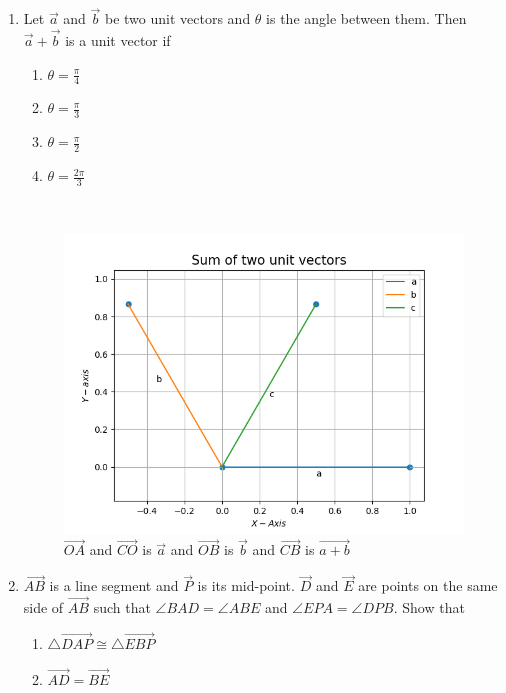 \begin{enumerate}[label=\thesection.\arabic*,ref=\thesection.\theenumi]
\item Let $\vec{a}$ and $\vec{b}$ be two unit vectors and $\theta$ is the angle between them. Then $\vec{a}+\vec{b}$ is a unit vector if
	\begin{enumerate}
		\item $\theta = \frac{\pi}{4}$
		\item $\theta = \frac{\pi}{3}$
		\item $\theta = \frac{\pi}{2}$
		\item $\theta = \frac{2\pi}{3}$
			\end{enumerate}
\solution

\\
\begin{figure}[!ht]
	\centering
	\includegraphics[width=\columnwidth]{chapters/12/10/5/17/codes/Python/figs/fig.png}
	\caption{$\vec{OA}$ and $\vec{CO}$ is $\vec{a}$ and $\vec{OB}$ is $\vec{b}$ and $\vec{CB}$ is $\vec{a+b}$}
	\label{fig:12/10/5/17}
\end{figure}
	\item $\vec{AB}$ is a line segment and $\vec{P}$ is its mid-point. $\vec{D}$ and $\vec{E}$ are points on the same side of $\vec{AB}$ such that $\angle BAD = \angle ABE$ and $\angle EPA = \angle DPB$. Show that
		\begin{enumerate}
			\item $\triangle \vec{DAP} \cong  \triangle \vec{EBP}$
			\item $\vec{AD} = \vec{BE}$
\end{enumerate}
\begin{figure}[!ht]
	\centering

\end{figure}
\end{enumerate}
